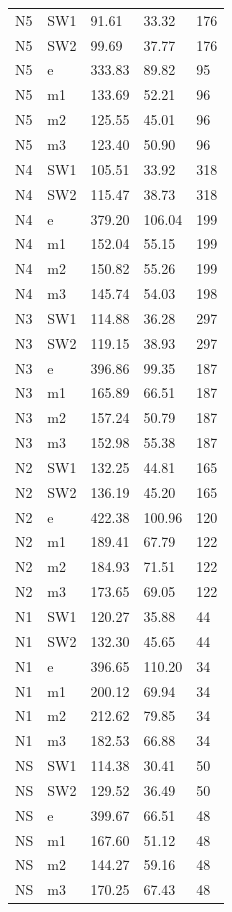 \begin{longtable}{lllll}
N5	&   SW1	&   91.61	&   33.32	&   176\\
N5	&   SW2	&   99.69	&   37.77	&   176\\
N5	&   e	&   333.83	&   89.82	&   95\\
N5	&   m1	&   133.69	&   52.21	&   96\\
N5	&   m2	&   125.55	&   45.01	&   96\\
N5	&   m3	&   123.40	&   50.90	&   96\\
N4	&   SW1	&   105.51	&   33.92	&   318\\
N4	&   SW2	&   115.47	&   38.73	&   318\\
N4	&   e	&   379.20	&   106.04	&   199\\
N4	&   m1	&   152.04	&   55.15	&   199\\
N4	&   m2	&   150.82	&   55.26	&   199\\
N4	&   m3	&   145.74	&   54.03	&   198\\
N3	&   SW1	&   114.88	&   36.28	&   297\\
N3	&   SW2	&   119.15	&   38.93	&   297\\
N3	&   e	&   396.86	&   99.35	&   187\\
N3	&   m1	&   165.89	&   66.51	&   187\\
N3	&   m2	&   157.24	&   50.79	&   187\\
N3	&   m3	&   152.98	&   55.38	&   187\\
N2	&   SW1	&   132.25	&   44.81	&   165\\
N2	&   SW2	&   136.19	&   45.20	&   165\\
N2	&   e	&   422.38	&   100.96	& 120\\
N2	&   m1	&   189.41	&   67.79	&   122\\
N2	&   m2	&   184.93	&   71.51	&   122\\
N2	&   m3	&   173.65	&   69.05	&   122\\
N1	&   SW1	&   120.27	&   35.88	&   44\\
N1	&   SW2	&   132.30	&   45.65	&   44\\
N1	&   e	&   396.65	&   110.20	&   34\\
N1	&   m1	&   200.12	&   69.94	&   34\\
N1	&   m2	&   212.62	&   79.85	&   34\\
N1	&   m3	&   182.53	&   66.88	&   34\\
NS	&   SW1	&   114.38	&   30.41	&   50\\
NS	&   SW2	&   129.52	&   36.49	&   50\\
NS	&   e	&   399.67	&   66.51	&   48\\
NS	&   m1	&   167.60	&   51.12	&   48\\
NS	&   m2	&   144.27	&   59.16	&   48\\
NS	&   m3	&   170.25	&   67.43	&   48\\

\end{longtable}

